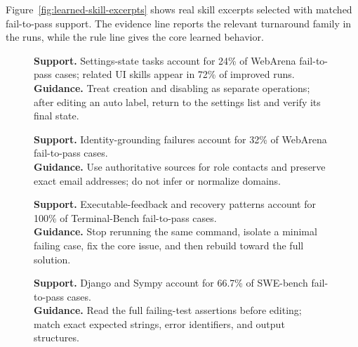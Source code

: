 Figure~\ref{fig:learned-skill-excerpts} shows real skill excerpts selected with
matched fail-to-pass support. The evidence line reports the relevant turnaround
family in the runs, while the rule line gives the core learned behavior.

\begin{figure}[t]
\centering
\begin{minipage}[t]{0.48\textwidth}
\begin{tcolorbox}[skillCard, colback=blue!2, colframe=blue!45,
title={WebArena: UI-state verification}]
\small
\textbf{Support.} Settings-state tasks account for 24\% of WebArena fail-to-pass cases; related UI skills appear in 72\% of improved runs.\\
\textbf{Guidance.} Treat creation and disabling as separate operations; after editing an auto label, return to the settings list and verify its final state.
\end{tcolorbox}
\end{minipage}
\hfill
\begin{minipage}[t]{0.48\textwidth}
\begin{tcolorbox}[skillCard, colback=blue!2, colframe=blue!45,
title={WebArena: grounded identity use}]
\small
\textbf{Support.} Identity-grounding failures account for 32\% of WebArena fail-to-pass cases.\\
\textbf{Guidance.} Use authoritative sources for role contacts and preserve exact email addresses; do not infer or normalize domains.
\end{tcolorbox}
\end{minipage}

\vspace{4pt}
\begin{minipage}[t]{0.48\textwidth}
\begin{tcolorbox}[skillCard, colback=orange!2, colframe=orange!45,
title={Terminal-Bench: executable recovery}]
\small
\textbf{Support.} Executable-feedback and recovery patterns account for 100\% of Terminal-Bench fail-to-pass cases.\\
\textbf{Guidance.} Stop rerunning the same command, isolate a minimal failing case, fix the core issue, and then rebuild toward the full solution.
\end{tcolorbox}
\end{minipage}
\hfill
\begin{minipage}[t]{0.48\textwidth}
\begin{tcolorbox}[skillCard, colback=green!2, colframe=green!45,
title={SWE-bench: test-grounded repair}]
\small
\textbf{Support.} Django and Sympy account for 66.7\% of SWE-bench fail-to-pass cases.\\
\textbf{Guidance.} Read the full failing-test assertions before editing; match exact expected strings, error identifiers, and output structures.
\end{tcolorbox}
\end{minipage}


\end{figure}
